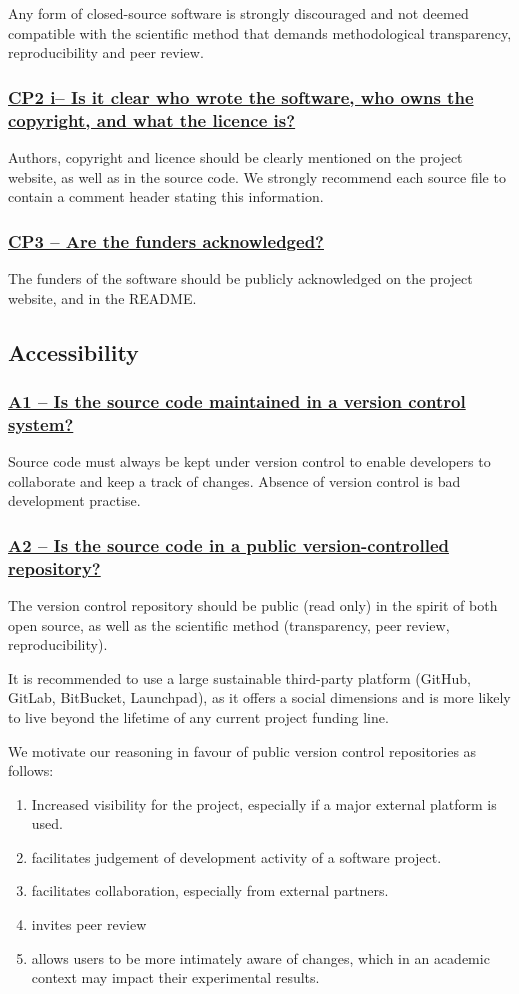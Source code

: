 \documentclass[a4paper,11pt]{article}
\newcommand{\criterion}[1]{\subsubsection*{\underline{#1}}}
\begin{document}
Any form of closed-source software is strongly discouraged and not deemed
compatible with the scientific method that demands methodological transparency,
reproducibility and peer review.

\criterion{CP2 i-- Is it clear who wrote the software, who owns the
copyright, and what the licence is?}

Authors, copyright and licence should be clearly mentioned on the project
website, as well as in the source code.  We strongly recommend each source file
to contain a comment header stating this information.

\criterion{CP3 -- Are the funders acknowledged?}

The funders of the software should be publicly acknowledged on the project
website, and in the README.



\subsection{Accessibility}

\criterion{A1 -- Is the source code maintained in a version control system?}

Source code must always be kept under version control to enable developers to
collaborate and keep a track of changes. Absence of version control is bad
development practise. 

\criterion{A2 -- Is the source code in a public version-controlled repository?}

The version control repository should be public (read only) in the spirit of both open
source, as well as the scientific method (transparency, peer review,
reproducibility). 

It is recommended to use a large sustainable third-party platform (GitHub,
GitLab, BitBucket, Launchpad), as it offers a social dimensions and is more
likely to live beyond the lifetime of any current project funding line.

We motivate our reasoning in favour of public version control repositories as follows:

\begin{enumerate}
    \item Increased visibility for the project, especially if a major external platform is used.
    \item facilitates judgement of development activity of a software project.
    \item facilitates collaboration, especially from external partners.
    \item invites peer review
    \item allows users to be more intimately aware of changes, which in an
        academic context may impact their experimental results.
\end{enumerate}
\end{document}

